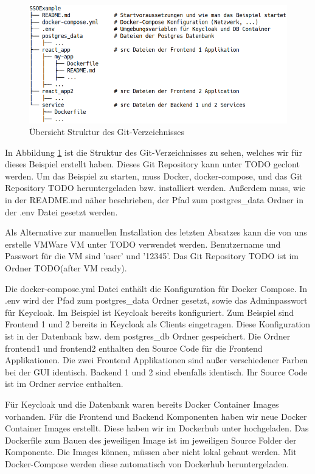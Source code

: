 \begin{figure}[!ht]
	\centering
	\includegraphics[width=1\textwidth]{Images/Ebert/srcDirectoryStructure.PNG}
	\caption{Übersicht Struktur des Git-Verzeichnisses}
	\label{fig:EB_Struktur des Git-Verzeichnisses}
\end{figure} %

In Abbildung \ref{fig:EB_Struktur des Git-Verzeichnisses} ist die Struktur des Git-Verzeichnisses zu sehen, welches wir für dieses Beispiel erstellt haben. Dieses Git Repository kann unter TODO geclont werden. Um das Beispiel zu starten, muss Docker, docker-compose, und das Git Repository TODO heruntergeladen bzw. installiert werden. Außerdem muss, wie in der README.md näher beschrieben, der Pfad zum postgres\_data Ordner in der .env Datei gesetzt werden.

Als Alternative zur manuellen Installation des letzten Absatzes kann die von uns erstelle VMWare VM unter TODO verwendet werden. Benutzername und Passwort für die VM sind 'user' und '12345'. Das Git Repository TODO ist im Ordner TODO(after VM ready).

Die docker-compose.yml Datei enthält die Konfiguration für Docker Compose. In .env wird der Pfad zum postgres\_data Ordner gesetzt, sowie das Adminpasswort für Keycloak. Im Beispiel ist Keycloak bereits konfiguriert. Zum Beispiel sind Frontend 1 und 2 bereits in Keycloak als Clients eingetragen. Diese Konfiguration ist in der Datenbank bzw. dem postgres\_db Ordner gespeichert. Die Ordner frontend1 und frontend2 enthalten den Source Code für die Frontend Applikationen. Die zwei Frontend Applikationen sind außer verschiedener Farben bei der GUI identisch. Backend 1 und 2 sind ebenfalls identisch. Ihr Source Code ist im Ordner service enthalten. 

Für Keycloak und die Datenbank waren bereits Docker Container Images vorhanden. Für die Frontend und Backend Komponenten haben wir neue Docker Container Images erstellt. Diese haben wir im Dockerhub unter \cite{EB42} hochgeladen. Das Dockerfile zum Bauen des jeweiligen Image ist im jeweiligen Source Folder der Komponente. Die Images können, müssen aber nicht lokal gebaut werden. Mit Docker-Compose werden diese automatisch von Dockerhub heruntergeladen.

